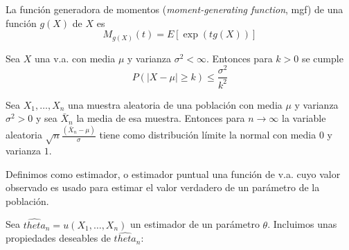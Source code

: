 \begin{definicion}
	La función generadora de momentos (\textit{moment-generating function}, mgf) de una función $g(X)$ de $X$ es
	\[ M_{g(X)}(t) = E[ \exp(tg(X)) ] \]
\end{definicion}

\begin{teorema}
	Sea $X$ una v.a. con media $\mu$ y varianza $\sigma^2 < \infty$. Entonces para $k > 0$ se cumple
		\[ P(|X - \mu| \geq k) \leq \frac{\sigma^2}{k^2} \]
\end{teorema}

\begin{teorema}
	Sea $X_1, \dots, X_n$ una muestra aleatoria de una población con media $\mu$ y varianza $\sigma^2 > 0$ y sea $\bar{X}_n$ la media de esa muestra. Entonces para $n \rightarrow \infty$ la variable aleatoria $\sqrt{n} \frac{(\bar{X}_n - \mu)}{\sigma}$ tiene como distribución límite la normal con media $0$ y varianza $1$.
\end{teorema}

\begin{definicion}[Estimador]
	Definimos como estimador, o estimador puntual una función de v.a. cuyo valor observado es usado para estimar el valor verdadero de un parámetro de la población. 
\end{definicion}

	Sea $\hat{theta}_n = u(X_1, \dots, X_n)$ un estimador de un parámetro $\theta$. Incluimos unas propiedades deseables de $\hat{theta}_n$:
	
